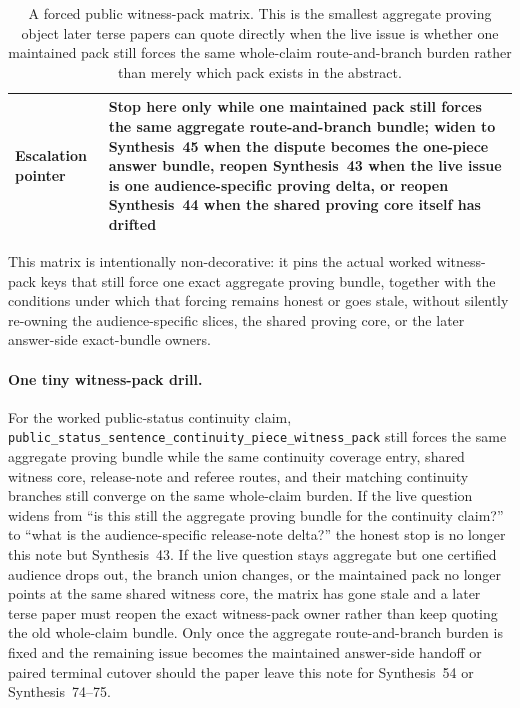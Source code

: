 \documentclass[11pt]{article}
\begin{document}
\begin{table}[t]
\begin{tabularx}{\linewidth}{@{}lX@{}}
Escalation pointer & Stop here only while one maintained pack still forces the same aggregate route-and-branch bundle; widen to Synthesis~45 when the dispute becomes the one-piece answer bundle, reopen Synthesis~43 when the live issue is one audience-specific proving delta, or reopen Synthesis~44 when the shared proving core itself has drifted \\
\bottomrule
\end{tabularx}
\caption{A forced public witness-pack matrix. This is the smallest aggregate proving object later terse papers can quote directly when the live issue is whether one maintained pack still forces the same whole-claim route-and-branch burden rather than merely which pack exists in the abstract.}
\label{tab:forced-public-witness-pack-matrix}
\end{table}

This matrix is intentionally non-decorative: it pins the actual worked witness-pack keys that still force one exact aggregate proving bundle, together with the conditions under which that forcing remains honest or goes stale, without silently re-owning the audience-specific slices, the shared proving core, or the later answer-side exact-bundle owners.\cite{series:workedexample}

\paragraph{One tiny witness-pack drill.}
For the worked public-status continuity claim, \nolinkurl{public_status_sentence_continuity_piece_witness_pack} still forces the same aggregate proving bundle while the same continuity coverage entry, shared witness core, release-note and referee routes, and their matching continuity branches still converge on the same whole-claim burden. If the live question widens from ``is this still the aggregate proving bundle for the continuity claim?'' to ``what is the audience-specific release-note delta?'' the honest stop is no longer this note but Synthesis~43. If the live question stays aggregate but one certified audience drops out, the branch union changes, or the maintained pack no longer points at the same shared witness core, the matrix has gone stale and a later terse paper must reopen the exact witness-pack owner rather than keep quoting the old whole-claim bundle. Only once the aggregate route-and-branch burden is fixed and the remaining issue becomes the maintained answer-side handoff or paired terminal cutover should the paper leave this note for Synthesis~54 or Synthesis~74--75.\cite{series:workedexample}
\end{document}
